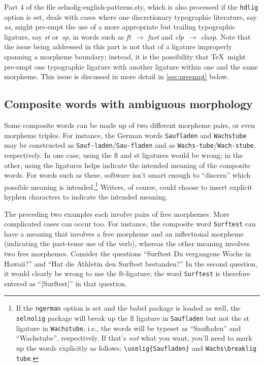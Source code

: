 \documentclass[11pt]{article}
\newcommand{\pkg}[1]{\textsf{#1}}
\newcommand{\opt}[1]{\texttt{#1}}
\begin{document}
Part 4 of the file \pkg{selnolig-english-patterns.sty}, which is also processed if the \opt{hdlig} option is set, deals with cases where one discretionary typographic literature, say \emph{as}, might pre-empt the use of a more appropriate but trailing typographic ligature, say \emph{st} or~\emph{sp}, in words such as \emph{ft}~$\to$ \emph{fast} and \emph{clp}~$\to$ \emph{clasp}. Note that the issue being addressed in this part is not that of a ligature improperly spanning a morpheme boundary; instead, it is the possibility that \TeX\ might pre-empt one typographic ligature with another ligature within one and the same morpheme. This issue is discussed in more detail in \cref{sec:preempt} below.


\subsection{Composite words with ambiguous morphology}

Some composite words can be made up of two different morpheme pairs, or even morpheme triples. For instance, the German words \opt{Saufladen} and \opt{Wachstube} may be constructed as \opt{Sauf-laden}\slash \opt{Sau-fladen} and as \opt{Wachs-tube}\slash \opt{Wach-stube}, respectively. In one case, using the fl and st ligatures would be wrong; in the other, using the ligatures helps indicate the intended meaning of the composite words. 
For words such as these, software isn't smart enough to \enquote{discern} which possible meaning is intended.\footnote{If the \opt{ngerman} option is set and the \pkg{babel} package is loaded as well, the \opt{selnolig} package will break up the fl ligature in \opt{Saufladen} but not the st ligature in \opt{Wachstube}, i.e., the words will be typeset as \enquote{Saufladen} and \enquote{Wachstube}, respectively. If that's \emph{not} what you want, you'll need to mark up the words explicitly as follows: \Verb+\uselig{Saufladen}+ and \Verb+Wachs\breaklig tube+.} 
Writers, of course, could choose to insert explicit hyphen characters to indicate the intended meaning.

The preceding two examples each involve pairs of free morphemes. More complicated cases can occur too. For instance, the composite word \opt{Surftest} can have a meaning that involves a free morpheme and an inflectional morpheme (indicating the past-tense use of the verb), whereas the other meaning involves two free morphemes. Consider the questions \enquote{Surftest Du vergangene Woche in Hawaii?} and \enquote{Hat die Athletin den Surf\breaklig tes\breaklig t bestanden?} In the second question, it would clearly be wrong to use the ft-ligature; the word \opt{Surftest} is therefore entered as ``|Surf\breaklig test|'' in that question.
\end{document}
